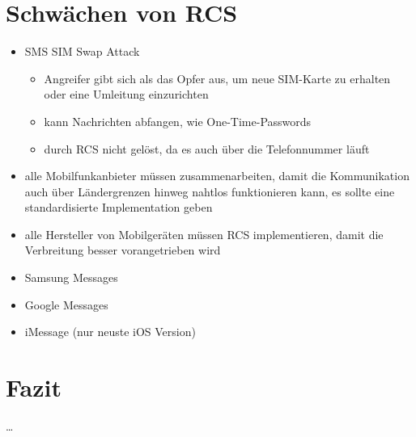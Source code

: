 \documentclass[conference]{IEEEtran}
\begin{document}
\section{Schwächen von RCS}

\begin{itemize}
    \item SMS SIM Swap Attack
          \begin{itemize}
              \item Angreifer gibt sich als das Opfer aus, um neue SIM-Karte zu erhalten oder eine Umleitung einzurichten
              \item kann Nachrichten abfangen, wie One-Time-Passwords
              \item durch RCS nicht gelöst, da es auch über die Telefonnummer läuft
          \end{itemize}
\end{itemize}
\cite{sendoutsms}

\begin{itemize}
    \item alle Mobilfunkanbieter müssen zusammenarbeiten, damit die Kommunikation auch über Ländergrenzen hinweg nahtlos funktionieren kann, es sollte eine standardisierte Implementation geben
    \item alle Hersteller von Mobilgeräten müssen RCS implementieren, damit die Verbreitung besser vorangetrieben wird
\end{itemize}
\cite{rcsmno}

\begin{itemize}
    \item Samsung Messages
    \item Google Messages
    \item iMessage (nur neuste iOS Version)
\end{itemize}

\section{Fazit}

\dots
\end{document}
